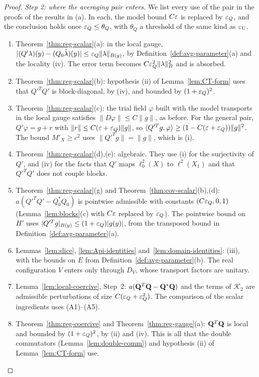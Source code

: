 \begin{proof}
\emph{Step 2: where the averaging pair enters.} We list every use of the pair in the proofs of the results in (a). In each, the model bound $C\varepsilon$ is replaced by $\varepsilon_Q$, and the conclusion holds once $\varepsilon_Q\le\theta_Q$, with $\theta_Q$ a threshold of the same kind as $\varepsilon_{\rm U}$.
\begin{enumerate}[label=(A\arabic*)]
\item Theorem~\ref{thm:reg-scalar}(a): in the local gauge, $|(Q'\lambda)(y)-(Q_0\tilde\lambda)(y)|\le\varepsilon_Q\|\lambda\|_{B(y)}$, by Definition~\ref{def:avg-parameter}(a) and the locality (iv). The error term becomes $C\varepsilon_Q^2\|\lambda\|_B^2$ and is absorbed.
\item Theorem~\ref{thm:reg-scalar}(b): hypothesis (ii) of Lemma~\ref{lem:CT-form} uses that $Q'^TQ'$ is block-diagonal, by (iv), and bounded by $(1+\varepsilon_Q)^2$.
\item Theorem~\ref{thm:reg-scalar}(c): the trial field $\varphi$ built with the model transports in the local gauge satisfies $\|D\varphi\|\le C\|g\|$, as before. For the general pair, $Q'\varphi=g+r$ with $\|r\|\le C(\varepsilon+\varepsilon_Q)\|g\|$, so $\langle Q'^Tg,\varphi\rangle\ge(1-C(\varepsilon+\varepsilon_Q))\|g\|^2$. The bound $M'_X\ge c^2$ uses $\|Q'^Tg\|=\|g\|$, which is (i).
\item Theorem~\ref{thm:reg-scalar}(d),(e): algebraic. They use (i) for the surjectivity of $Q'$, and (iv) for the facts that $Q'$ maps $\ell^2_0(X)$ to $\ell^2(X_1)$ and that $Q'^TQ'$ does not couple blocks.
\item Theorem~\ref{thm:reg-scalar}(g) and Theorem~\ref{thm:cov-scalar}(b),(d): $a(Q'^TQ'-Q_0^*Q_0)$ is pointwise admissible with constants $(C\varepsilon_Q,0,1)$ (Lemma~\ref{lem:blocks}(c) with $C\varepsilon$ replaced by $\varepsilon_Q$). The pointwise bound on $H'$ uses $|Q'^Tg|_{B(y)}\le(1+\varepsilon_Q)|g(y)|$, from the transposed bound in Definition~\ref{def:avg-parameter}(a).
\item Lemmas~\ref{lem:slice}, \ref{lem:Api-identities} and~\ref{lem:domain-identities}: (iii), with the bounds on $E$ from Definition~\ref{def:avg-parameter}(b). The real configuration $V$ enters only through $D_V$, whose transport factors are unitary.
\item Lemma~\ref{lem:local-coercive}, Step~2: $a(\mathbf Q^T\mathbf Q-\mathbf Q^*\mathbf Q)$ and the terms of $\mathcal K_2$ are admissible perturbations of size $C(\varepsilon_Q+\varepsilon_Q^2)$. The comparison of the scalar ingredients uses (A1)--(A5).
\item Theorem~\ref{thm:reg-coercive} and Theorem~\ref{thm:reg-gauge}(a): $\mathbf Q^T\mathbf Q$ is local and bounded by $(1+\varepsilon_Q)^2$, by (ii) and (iv). This is all that the double commutators (Lemma~\ref{lem:double-comm}) and hypothesis (ii) of Lemma~\ref{lem:CT-form} use.

\end{enumerate}
\end{proof}
